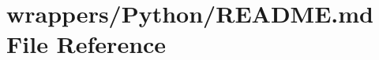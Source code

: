 \hypertarget{wrappers_2_python_2_r_e_a_d_m_e_8md}{}\section{wrappers/\+Python/\+R\+E\+A\+D\+ME.md File Reference}
\label{wrappers_2_python_2_r_e_a_d_m_e_8md}

